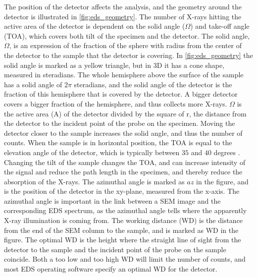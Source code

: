 The position of the detector affects the analysis, and the geometry around the detector is illustrated in \cref{fig:eds_geometry}.
The number of X-rays hitting the active area of the detector is dependent on the solid angle ($\Omega$) and take-off angle (TOA), which covers both tilt of the specimen and the detector.
The solid angle, $\Omega$, is an expression of the fraction of the sphere with radius from the center of the detector to the sample that the detector is covering.
In \cref{fig:eds_geometry} the solid angle is marked as a yellow triangle, but in 3D it has a cone shape, measured in steradians.
The whole hemisphere above the surface of the sample has a solid angle of $2\pi$ steradians, and the solid angle of the detector is the fraction of this hemisphere that is covered by the detector.
A bigger detector covers a bigger fraction of the hemisphere, and thus collects more X-rays.
$\Omega$ is the active area (A) of the detector divided by the square of r, the distance from the detector to the incident point of the probe on the specimen.
Moving the detector closer to the sample increases the solid angle, and thus the number of counts.
When the sample is in horizontal position, the TOA is equal to the elevation angle of the detector, which is typically between $35$ and $40$ degrees \cite{dtsaii_1_getting_started}.
Changing the tilt of the sample changes the TOA, and can increase intensity of the signal and reduce the path length in the specimen, and thereby reduce the absorption of the X-rays.
The azimuthal angle is marked as $az$ in the figure, and is the position of the detector in the xy-plane, measured from the x-axis.
The azimuthal angle is important in the link between a SEM image and the corresponding EDS spectrum, as the azimuthal angle tells where the apparently X-ray illumination is coming from.
The working distance (WD) is the distance from the end of the SEM column to the sample, and is marked as WD in the figure.
The optimal WD is the height where the straight line of sight from the detector to the sample and the incident point of the probe on the sample coincide.
Both a too low and too high WD will limit the number of counts, and most EDS operating software specify an optimal WD for the detector.




